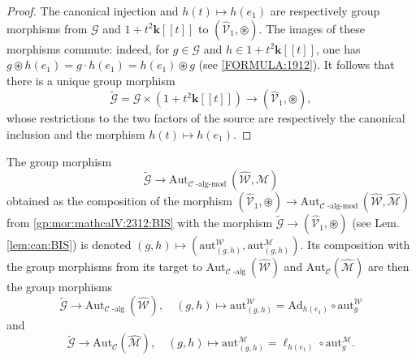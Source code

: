 \documentclass[10pt]{amsart}
\numberwithin{equation}{subsection}
\begin{document}
\begin{proof}
The canonical injection and $h(t)\mapsto h(e_1)$ are respectively group morphisms from 
$\mathcal G$ and $1+t^2\mathbf k[[t]]$ to $(\hat{\mathcal V}_1,\circledast)$. The images of these
morphisms commute: indeed, for $g\in \mathcal G$ and $h\in 1+t^2\mathbf k[[t]]$, one has 
$g\circledast h(e_1)=g\cdot h(e_1)=h(e_1)\circledast g$ (see \eqref{FORMULA:1912}). It follows that there is a 
unique group morphism 
\begin{equation}\label{pre:pre:mor:BIS}
\tilde{\mathcal G}=\mathcal G\times(1+t^2\mathbf k[[t]])\to(\hat{\mathcal V}_1,\circledast),
\end{equation}
whose restrictions to the two factors of the source are respectively the canonical inclusion and 
the morphism $h(t)\mapsto h(e_1)$. 
\end{proof}

\begin{defn}\label{def:gp:mor:BIS}
The group morphism 
\begin{equation}\label{mor:G:Aut:alg:mod}
  \tilde{\mathcal G}\to\mathrm{Aut}_{\mathcal C\operatorname{-alg-mod}}(\hat{\mathcal W},\hat{\mathcal M})  
\end{equation}
obtained as the composition of the morphism $(\hat{\mathcal V}_1,\circledast)\to
\mathrm{Aut}_{\mathcal C\operatorname{-alg-mod}}(\hat{\mathcal W},\hat{\mathcal M})$
from \eqref{gp:mor:mathcalV:2312:BIS} with the morphism  $\tilde{\mathcal G}\to (\hat{\mathcal V}_1,\circledast)$ (see Lem. \ref{lem:can:BIS})
is denoted $(g,h)\mapsto(\mathrm{aut}_{(g,h)}^{\mathcal W},\mathrm{aut}_{(g,h)}^{\mathcal M})$. 
Its composition with the group morphisms from its target to $\mathrm{Aut}_{\mathcal C\operatorname{-alg}}(\hat{\mathcal W})$
and $\mathrm{Aut}_{\mathcal C}(\hat{\mathcal M})$ are then the group morphisms 
\begin{equation}\label{mor:G:Aut:alg}
 \tilde{\mathcal G}\to\mathrm{Aut}_{\mathcal C\operatorname{-alg}}(\hat{\mathcal W}),\quad   
 (g,h)\mapsto\mathrm{aut}_{(g,h)}^{\mathcal W}=\mathrm{Ad}_{h(e_1)} \circ \mathrm{aut}_{g}^{\mathcal W}
\end{equation}
and
\begin{equation}\label{mor:G:Aut:mod}
 \tilde{\mathcal G}\to\mathrm{Aut}_{\mathcal C}(\hat{\mathcal M}),\quad   (g,h)\mapsto\mathrm{aut}_{(g,h)}^{\mathcal M}
 =\ell_{h(e_1)} \circ \mathrm{aut}_{g}^{\mathcal M}. 
\end{equation}
\end{defn}
\end{document}
